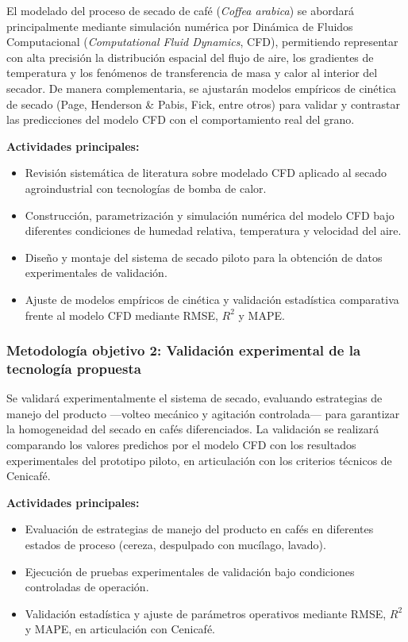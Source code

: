 El modelado del proceso de secado de café (\textit{Coffea arabica}) se abordará 
principalmente mediante simulación numérica por Dinámica de Fluidos Computacional 
(\textit{Computational Fluid Dynamics}, CFD), permitiendo representar con alta 
precisión la distribución espacial del flujo de aire, los gradientes de temperatura 
y los fenómenos de transferencia de masa y calor al interior del secador. De manera 
complementaria, se ajustarán modelos empíricos de cinética de secado (Page, Henderson 
\& Pabis, Fick, entre otros) para validar y contrastar las predicciones del modelo 
CFD con el comportamiento real del grano.

\textbf{Actividades principales:}
\begin{itemize}
    \item Revisión sistemática de literatura sobre modelado CFD aplicado al secado 
    agroindustrial con tecnologías de bomba de calor.
    \item Construcción, parametrización y simulación numérica del modelo CFD bajo 
    diferentes condiciones de humedad relativa, temperatura y velocidad del aire.
    \item Diseño y montaje del sistema de secado piloto para la obtención de datos 
    experimentales de validación.
    \item Ajuste de modelos empíricos de cinética y validación estadística comparativa 
    frente al modelo CFD mediante RMSE, $R^2$ y MAPE.
\end{itemize}

\subsubsection*{Metodología objetivo 2: Validación experimental de la tecnología propuesta}

Se validará experimentalmente el sistema de secado, evaluando estrategias de manejo 
del producto —volteo mecánico y agitación controlada— para garantizar la homogeneidad 
del secado en cafés diferenciados. La validación se realizará comparando los valores 
predichos por el modelo CFD con los resultados experimentales del prototipo piloto, 
en articulación con los criterios técnicos de Cenicafé.

\textbf{Actividades principales:}
\begin{itemize}
    \item Evaluación de estrategias de manejo del producto en cafés en diferentes 
    estados de proceso (cereza, despulpado con mucílago, lavado).
    \item Ejecución de pruebas experimentales de validación bajo condiciones 
    controladas de operación.
    \item Validación estadística y ajuste de parámetros operativos mediante RMSE, 
    $R^2$ y MAPE, en articulación con Cenicafé.
\end{itemize}


